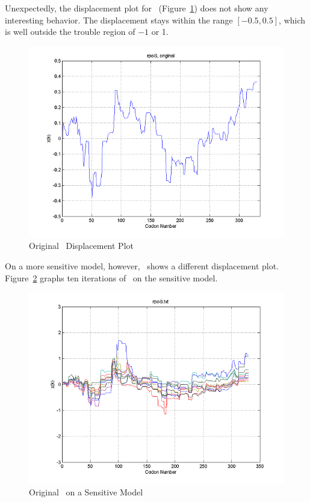 \documentclass[10pt,twocolumn,draft]{article}
\begin{document}
Unexpectedly, the displacement plot for \rpoS\ (Figure~\ref{rpos:disp}) does not show any interesting behavior.
The displacement stays within the range $[-0.5,0.5]$, which is well outside the trouble region of $-1$ or 1.

\begin{figure}[htp]
    \centering
    \caption{Original \rpoS\ Displacement Plot}
    \label{rpos:disp}
    \includegraphics[scale=0.7]{rpoS/original.png}
\end{figure}

On a more sensitive model, however, \rpoS\ shows a different displacement plot.  
Figure~\ref{rpos:sensdisp} graphs ten iterations of \rpoS\ on the sensitive model.

\begin{figure}[htp]
    \centering
    \caption{Original \rpoS\ on a Sensitive Model}
    \label{rpos:sensdisp}
    \includegraphics[scale=0.7]{rpoS/sensitive.png}
\end{figure}
\end{document}
